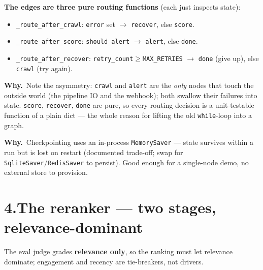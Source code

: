 \documentclass[11pt,a4paper]{article}
\newcommand{\why}[1]{%
  \par\vspace{2pt}%
  \noindent\colorbox{mist}{\begin{minipage}{\dimexpr\linewidth-2\fboxsep}%
  \textcolor{accent2}{\textbf{Why.}}~#1\end{minipage}}\par\vspace{3pt}}
\newcommand{\code}[1]{\texttt{\small #1}}
\begin{document}
\noindent\textbf{The edges are three pure routing functions} (each just inspects state):
\begin{itemize}
\item \code{\_route\_after\_crawl}: \code{error} set $\rightarrow$ \code{recover}, else
\code{score}.
\item \code{\_route\_after\_score}: \code{should\_alert} $\rightarrow$ \code{alert}, else
\code{done}.
\item \code{\_route\_after\_recover}: \code{retry\_count}$\ge$\code{MAX\_RETRIES} $\rightarrow$
\code{done} (give up), else \code{crawl} (try again).
\end{itemize}

\why{Note the asymmetry: \code{crawl} and \code{alert} are the \emph{only} nodes that touch
the outside world (the pipeline IO and the webhook); both swallow their failures into state.
\code{score}, \code{recover}, \code{done} are pure, so every routing decision is a unit-testable
function of a plain dict --- the whole reason for lifting the old \code{while}-loop into a graph.}

\why{Checkpointing uses an in-process \code{MemorySaver} --- state survives
within a run but is lost on restart (documented trade-off; swap for
\code{SqliteSaver}/\code{RedisSaver} to persist). Good enough for a single-node
demo, no external store to provision.}

\section*{4.\quad The reranker --- two stages, relevance-dominant}

The eval judge grades \textbf{relevance only}, so the ranking must let relevance
dominate; engagement and recency are tie-breakers, not drivers.

\begin{center}
\end{center}
\end{document}
